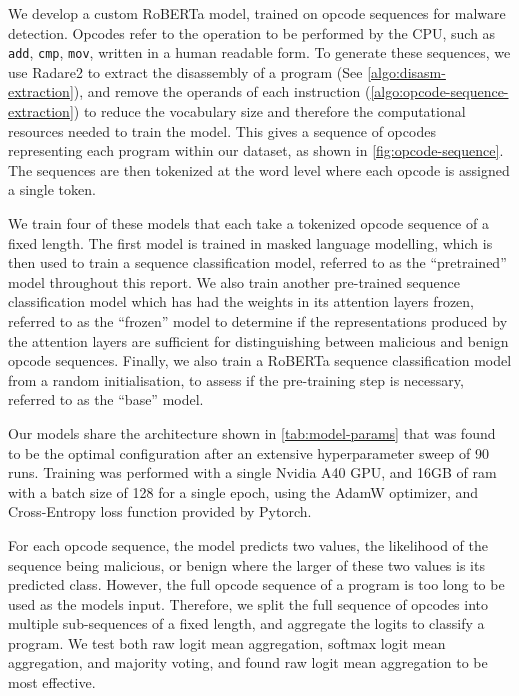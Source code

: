 \documentclass[conference,compsoc]{IEEEtran}
\begin{document}
We develop a custom RoBERTa model, trained on opcode sequences for malware detection. Opcodes refer to the operation to be performed by the CPU, such as \texttt{add}, \texttt{cmp}, \texttt{mov}, written in a human readable form. To generate these sequences, we use Radare2 to extract the disassembly of a program (See \ref{algo:disasm-extraction}), and remove the operands of each instruction (\ref{algo:opcode-sequence-extraction}) to reduce the vocabulary size and therefore the computational resources needed to train the model. This gives a sequence of opcodes representing each program within our dataset, as shown in \ref{fig:opcode-sequence}. The sequences are then tokenized at the word level where each opcode is assigned a single token. 

We train four of these models that each take a tokenized opcode sequence of a fixed length. The first model is trained in masked language modelling, which is then used to train a sequence classification model, referred to as the ``pretrained'' model throughout this report. We also train another pre-trained sequence classification model which has had the weights in its attention layers frozen, referred to as the ``frozen'' model to determine if the representations produced by the attention layers are sufficient for distinguishing between malicious and benign opcode sequences. Finally, we also train a RoBERTa sequence classification model from a random initialisation, to assess if the pre-training step is necessary, referred to as the ``base'' model.  

Our models share the architecture shown in \ref{tab:model-params} that was found to be the optimal configuration after an extensive hyperparameter sweep of 90 runs. Training was performed with a single Nvidia A40 GPU, and 16GB of ram with a batch size of 128 for a single epoch, using the AdamW optimizer, and Cross-Entropy loss function provided by Pytorch.

For each opcode sequence, the model predicts two values, the likelihood of the sequence being malicious, or benign where the larger of these two values is its predicted class. However, the full opcode sequence of a program is too long to be used as the models input. Therefore, we split the full sequence of opcodes into multiple sub-sequences of a fixed length, and aggregate the logits to classify a program. We test both raw logit mean aggregation, softmax logit mean aggregation, and majority voting, and found raw logit mean aggregation to be most effective. 
\end{document}
